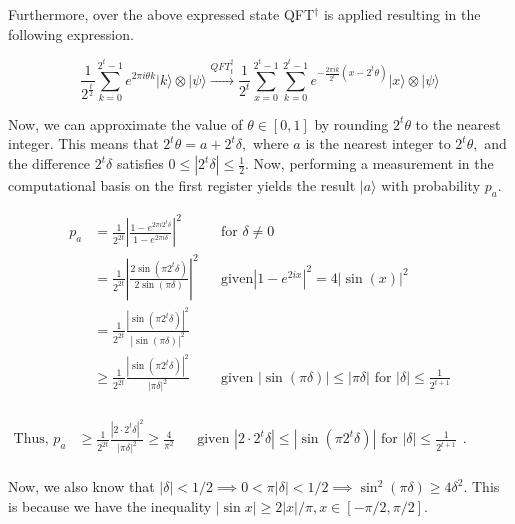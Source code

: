 \documentclass[11.5pt, paper=a4]{article}
\theoremstyle{definition}
\numberwithin{theorem}{section}
\begin{document}
Furthermore, over the above expressed state QFT$^{\dagger}$ is applied resulting in the following expression.

$$\frac {1}{2^{\frac {t}{2}}}\sum _{k=0}^{2^{t}-1}e^{{2\pi i} \theta k}|k\rangle \otimes | \psi \rangle \xrightarrow{{QFT}_t^{\dagger}} \frac {1}{2^t}\sum _{x=0}^{2^{t}-1}\sum _{k=0}^{2^{t}-1} e^{-\frac{2\pi i k}{2^t}(x - 2^t \theta)} |x\rangle \otimes |\psi\rangle$$

Now, we can approximate the value of $\theta \in [0, 1]$ by rounding ${ 2^{t}\theta }$ to the nearest integer. This means that ${ 2^{t}\theta =a+2^{t}\delta ,}$ where ${ a}$ is the nearest integer to ${ 2^{t}\theta ,}$ and the difference ${ 2^{t}\delta }$ satisfies ${ 0\leqslant |2^{t}\delta |\leqslant {\tfrac {1}{2}}}$. Now, performing a measurement in the computational basis on the first register yields the result ${ |a\rangle }$ with probability $p_a$.

$${\begin{aligned} p_a&={\frac {1}{2^{2t}}}\left|{\frac {1-{e^{2\pi i2^{t}\delta }}}{1-{e^{2\pi i\delta }}}}\right|^{2}&&{\text{for }}\delta \neq 0\\[6pt]&={\frac {1}{2^{2t}}}\left|{\frac {2\sin \left(\pi 2^{t}\delta \right)}{2\sin(\pi \delta )}}\right|^{2}&& \text{given} \left|1-e^{2ix}\right|^{2}=4\left|\sin(x)\right|^{2}\\[6pt]&={\frac {1}{2^{2t}}}{\frac {\left|\sin \left(\pi 2^{t}\delta \right)\right|^{2}}{|\sin(\pi \delta )|^{2}}}\\[6pt]&\geqslant {\frac {1}{2^{2t}}}{\frac {\left|\sin \left(\pi 2^{t}\delta \right)\right|^{2}}{|\pi \delta |^{2}}}&&\text{given }|\sin(\pi \delta )|\leqslant |\pi \delta |{\text{ for }}|\delta |\leqslant {\frac {1}{2^{t+1}}}\\[6pt]\end{aligned}}$$

${\begin{aligned}\text{Thus, }p_a&\geqslant {\frac {1}{2^{2t}}}{\frac {|2\cdot 2^{t}\delta |^{2}}{|\pi \delta |^{2}}}\geqslant {\frac {4}{\pi ^{2}}}&&\text{given }|2\cdot 2^{t}\delta |\leqslant |\sin(\pi 2^{t}\delta )|{\text{ for }}|\delta |\leqslant {\frac {1}{2^{t+1}}}\\[6pt]\end{aligned}}$.

Now, we also know that $|\delta| < 1/2 \implies 0 < \pi |\delta| < 1/2 \implies \sin^2(\pi \delta) \geq 4 \delta^2$. This is because we have the inequality $|\sin x| \geq 2|x|/\pi, x \in [-\pi/2, \pi/2]$.
\end{document}
